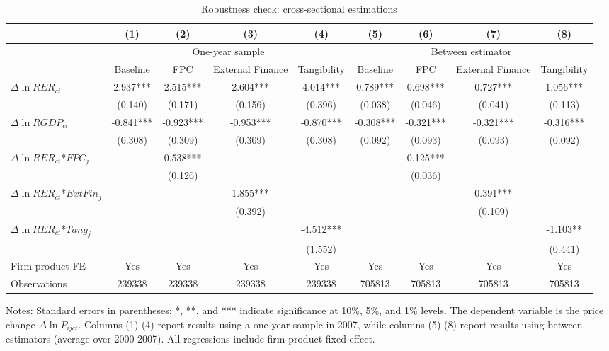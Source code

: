 \documentclass[12pt]{article}
\begin{document}
\begin{table}
	\centering
	\caption{Robustness check: cross-sectional estimations}
	\begin{threeparttable}
		\begin{tabular}{lcccccccc}
			\toprule
			& (1)   & (2)   & (3)   & (4) &  (5)  &  (6)  & (7)  & (8)\\
			\midrule
			& \multicolumn{4}{c}{One-year sample} & \multicolumn{4}{c}{Between estimator}\\
			& Baseline & FPC   & External Finance & Tangibility & Baseline & FPC & External Finance & Tangibility\\
			\midrule
			$\Delta \ln RER_{ct}$ & 2.937*** & 2.515*** & 2.604*** & 4.014*** & 0.789*** & 0.698*** & 0.727*** & 1.056***\\
			& (0.140) & (0.171) & (0.156) & (0.396) & (0.038) & (0.046) & (0.041) & (0.113)\\
			$\Delta \ln RGDP_{ct}$ & -0.841*** & -0.923*** & -0.953*** & -0.870*** & -0.308*** & -0.321*** & -0.321*** & -0.316***\\
			& (0.308) & (0.309) & (0.309) & (0.308) & (0.092) & (0.093) & (0.093) & (0.092)\\
			$\Delta \ln RER_{ct}$*$FPC_{j}$ &       & 0.538*** &       &  && 0.125*** &&\\
			&       & (0.126) &       &  && (0.036) &&\\
			$\Delta \ln RER_{ct}$*$ExtFin_{j}$ &       &       & 1.855*** &  & &  & 0.391*** & \\
			&       &       & (0.392) &  &&  & (0.109) &\\
			$\Delta \ln RER_{ct}$*$Tang_{j}$ &       &       &       & -4.512*** &&&& -1.103** \\
			&       &       &       & (1.552) &&&& (0.441)\\
			Firm-product FE &  Yes   & Yes   & Yes   & Yes &Yes   & Yes   & Yes   & Yes\\
			Observations & 239338 & 239338 & 239338 & 239338 & 705813 & 705813 & 705813 & 705813\\
			\bottomrule
		\end{tabular}
		\begin{tablenotes}
			\footnotesize
			\item[Notes:] Standard errors in parentheses; *, **, and *** indicate significance at 10\%, 5\%, and 1\% levels. The dependent variable is the price change $\Delta \ln P_{ijct}$. Columns (1)-(4) report results using a one-year sample in 2007, while columns (5)-(8) report results using between estimators (average over 2000-2007). All regressions include firm-product fixed effect.
		\end{tablenotes}
	\end{threeparttable}
	\label{tab.robust.crosec}
\end{table}
\end{document}
